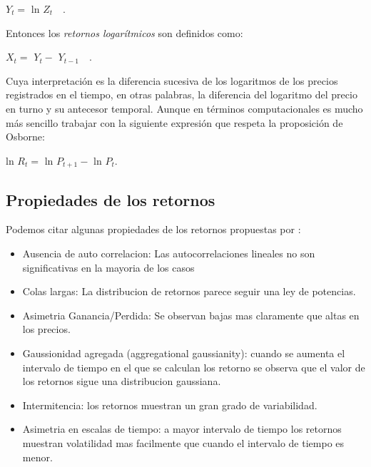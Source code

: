 \begin{center}
$\mathit{Y_{t}} = $ ln $\mathit{Z_{t}}$~~.
\end{center}

Entonces los \textit{retornos logarítmicos} son definidos como: 

\begin{center}
$X_t = $ $\mathit{Y_{t}} - $  $\mathit{Y_{t - 1}}$~~.
\end{center}

Cuya interpretación es la diferencia sucesiva de los logaritmos de los precios  registrados en el tiempo, en otras palabras, la diferencia del logaritmo del precio en turno y su antecesor temporal. Aunque en términos computacionales es mucho más sencillo trabajar con la siguiente expresión que respeta la proposición de Osborne\citep[][]{slanina}: 
\begin{center}
ln $R_t = $ ln $\mathit{P_{t+1}} - $ ln $\mathit{P_{t}}$.
\end{center}%


\subsection{Propiedades de los retornos}
\label{retornos}
Podemos citar algunas propiedades de los retornos propuestas por \cite{Cont2001}:

\begin{itemize}
	\item {Ausencia de auto correlacion: Las autocorrelaciones lineales no son significativas en la mayoria de los casos}
	\item {Colas largas: La distribucion de retornos parece seguir una ley de potencias.}
	\item Asimetria Ganancia/Perdida: Se observan bajas mas claramente que altas en los precios. 
	\item Gaussionidad agregada (aggregational gaussianity): cuando se aumenta el intervalo de tiempo en el que se calculan los retorno se observa que el valor de los retornos sigue una distribucion gaussiana. 
	\item Intermitencia: los retornos muestran un gran grado de variabilidad.
	\item Asimetria en escalas de tiempo: a mayor intervalo de tiempo los retornos muestran volatilidad mas facilmente que cuando el intervalo de tiempo es menor.
\end{itemize}

